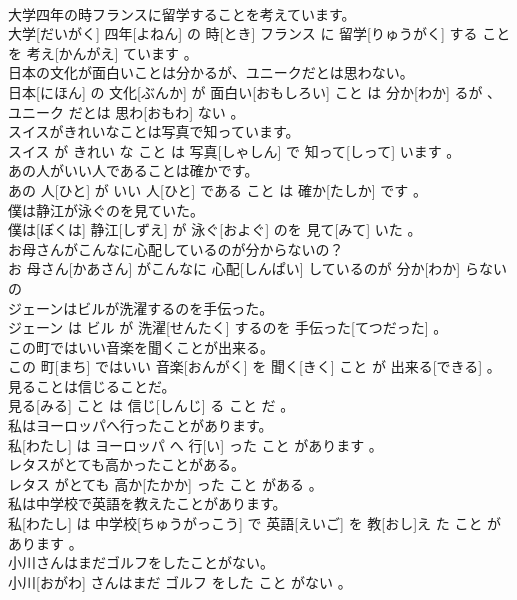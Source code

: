 \documentclass[8pt]{extreport}
\begin{document}
\begin{CJK}{UTF8}{min}
\\	大学四年の時フランスに留学することを考えています。	
\\	大学[だいがく] 四年[よねん] の 時[とき] フランス に 留学[りゅうがく] する こと を 考え[かんがえ] ています 。
\\	日本の文化が面白いことは分かるが、ユニークだとは思わない。	
\\	日本[にほん] の 文化[ぶんか] が 面白い[おもしろい] こと は 分か[わか] るが 、 ユニーク だとは 思わ[おもわ] ない 。
\\	スイスがきれいなことは写真で知っています。	
\\	スイス が きれい な こと は 写真[しゃしん] で 知って[しって] います 。
\\	あの人がいい人であることは確かです。	
\\	あの 人[ひと] が いい 人[ひと] である こと は 確か[たしか] です 。
\\	僕は静江が泳ぐのを見ていた。	
\\	僕は[ぼくは] 静江[しずえ] が 泳ぐ[およぐ] のを 見て[みて] いた 。
\\	お母さんがこんなに心配しているのが分からないの？	
\\	お 母さん[かあさん] がこんなに 心配[しんぱい] しているのが 分か[わか] らないの 
\\	ジェーンはビルが洗濯するのを手伝った。	
\\	ジェーン は ビル が 洗濯[せんたく] するのを 手伝った[てつだった] 。
\\	この町ではいい音楽を聞くことが出来る。	
\\	この 町[まち] ではいい 音楽[おんがく] を 聞く[きく] こと が 出来る[できる] 。
\\	見ることは信じることだ。	
\\	見る[みる] こと は 信じ[しんじ] る こと だ 。
\\	私はヨーロッパへ行ったことがあります。	
\\	私[わたし] は ヨーロッパ へ 行[い] った こと があります 。
\\	レタスがとても高かったことがある。	
\\	レタス がとても 高か[たかか] った こと がある 。
\\	私は中学校で英語を教えたことがあります。	
\\	私[わたし] は 中学校[ちゅうがっこう] で 英語[えいご] を 教[おし]え た こと があります 。
\\	小川さんはまだゴルフをしたことがない。	
\\	小川[おがわ] さんはまだ ゴルフ をした こと がない 。

\end{CJK}
\end{document}
